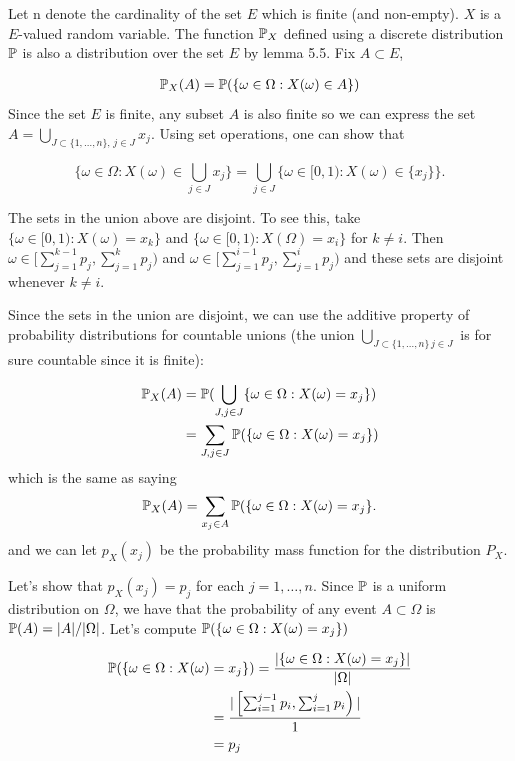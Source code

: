 
Let n denote the cardinality of the set $ E $ which is finite (and non-empty).
$ X$ is a $ E$-valued random variable. The function $ \P_{X} $ defined using a discrete distribution
$ \P$ is also a distribution over the set $ E$ by lemma 5.5. Fix $ A \subset E$,

\begin{align*}
    \P_{X}(A) &= \P( \{ \omega \in \Omega: X(\omega) \in A \} )  \\
\end{align*}
Since the set $ E $ is finite, any subset $ A $ is also finite so 
we can express the set $  A = \bigcup_{J \subset \{ 1,\dots,n \} , \, j \in J} x_{j}$. 
Using set operations, one can show that 

\[
    \{ \omega \in \Omega: X(\omega) \in \bigcup_{j \in J }  x_{j}  \} = \bigcup_{j \in J} \{ \omega
    \in [0,1): X(\omega) \in \{ x_{j}  \}   \}  
.\] 

The sets in the union above are disjoint. To see this, take $ \{ \omega \in [0,1): X(\omega) =
x_{k}  \} $ and $ \{ \omega \in [0,1): X(\Omega) = x_{i}  \} $ for $ k\neq i$. 
Then $ \omega \in [ \sum_{j=1}^{k-1} p_{j}, \sum_{j=1}^{k} p_{j} )  $ and $ \omega \in [
\sum_{j=1}^{i-1} p_{j}, \sum_{j=1}^{i} p_{j})  $ and these sets are disjoint whenever $ k \neq i$.

Since the sets in the union are disjoint, we can use the additive property of probability
distributions for countable unions (the union $ \bigcup_{J \subset \{ 1,\dots,n \} \, j \in J} $ is
for sure countable since it is finite):

\begin{align*}
    \P_{X} (A) &= \P(\bigcup_{J, j\in J}  \{ \omega \in \Omega: X(\omega) = x_{j}  \} )\\
	       &= \sum_{J, j\in J} \P(\{ \omega \in \Omega: X(\omega) = x_{j}  \} )
\end{align*}
which is the same as saying 
\[
    \P_{X} (A) = \sum_{x_{j} \in A } \P(\{ \omega \in \Omega: X(\omega) = x_{j}  \} 
.\]
and we can let $ p_{X}(x_{j})   $ be the probability mass function for the distribution $ P_{X} $. 

Let's show that $ p_{X}(x_{j})=p_{j} $ for each $ j = 1,\dots,n$. Since $ \P$ is a uniform
distribution on $ \Omega$, we have that the probability of any event $ A \subset \Omega$ is 
$ \P(A) = |A|/|\Omega|$. Let's compute $ \P ( \{ \omega \in \Omega: X(\omega) = x_{j}  \} ) $

\begin{align*}
    \P ( \{ \omega \in \Omega: X(\omega) &= x_{j}  \} ) = \frac{|\{ \omega \in \Omega: X(\omega) = x_{j}
    \} |}{|\Omega|} \\
					 &= \frac{|\left[ \sum_{i=1}^{j-1} p_{i}, \sum_{i=1}^{j}
					 p_{i}  \right)|}{1} \\
					 &= p_{j} 
\end{align*}
